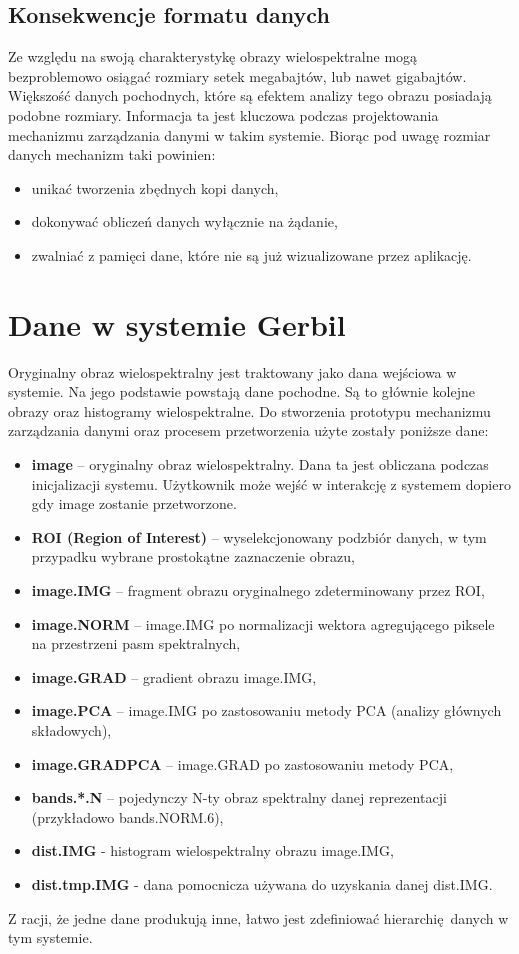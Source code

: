 \subsection{Konsekwencje formatu danych}
Ze względu na swoją charakterystykę obrazy wielospektralne mogą bezproblemowo osiągać rozmiary setek megabajtów, lub nawet gigabajtów. Większość danych pochodnych, które są efektem analizy tego obrazu posiadają podobne rozmiary. Informacja ta jest kluczowa podczas projektowania mechanizmu zarządzania danymi w takim systemie. Biorąc pod uwagę rozmiar danych mechanizm taki powinien:
\begin{itemize}
\item unikać tworzenia zbędnych kopi danych,
\item dokonywać obliczeń danych wyłącznie na żądanie,
\item zwalniać z pamięci dane, które nie są już wizualizowane przez aplikację.
\end{itemize}

\section{Dane w systemie Gerbil}

Oryginalny obraz wielospektralny jest traktowany jako dana wejściowa w systemie. Na jego podstawie powstają dane pochodne. Są to głównie kolejne obrazy oraz histogramy wielospektralne. Do stworzenia prototypu mechanizmu zarządzania danymi oraz procesem przetworzenia użyte zostały poniższe dane:
\begin{itemize}
	\item \textbf{image} -- oryginalny obraz wielospektralny. Dana ta jest obliczana podczas inicjalizacji systemu. Użytkownik może wejść w interakcję z systemem dopiero gdy image zostanie przetworzone.
	\item \textbf{ROI (Region of Interest)} -- wyselekcjonowany podzbiór danych, w tym przypadku wybrane prostokątne zaznaczenie obrazu,
	\item \textbf{image.IMG} -- fragment obrazu oryginalnego zdeterminowany przez ROI,
	\item \textbf{image.NORM} -- image.IMG po normalizacji wektora agregującego piksele na przestrzeni pasm spektralnych,
	\item \textbf{image.GRAD} -- gradient obrazu image.IMG,
	\item \textbf{image.PCA} -- image.IMG po zastosowaniu metody PCA (analizy głównych składowych),
	\item \textbf{image.GRADPCA} -- image.GRAD po zastosowaniu metody PCA,
	\item \textbf{bands.*.N} -- pojedynczy N-ty obraz spektralny danej reprezentacji (przykładowo bands.NORM.6),
	\item \textbf{dist.IMG} - histogram wielospektralny obrazu image.IMG,
	\item \textbf{dist.tmp.IMG} - dana pomocnicza używana do uzyskania danej dist.IMG. 
\end{itemize}
Z racji, że jedne dane produkują inne, łatwo jest zdefiniować hierarchię danych w tym systemie.

